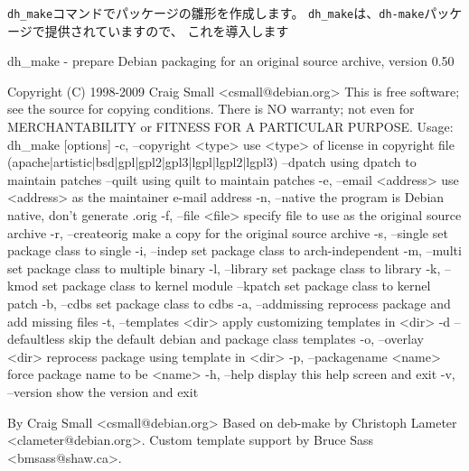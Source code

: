 \documentclass[mingoth,a4paper]{jsarticle}
\begin{document}
{\tt dh\_make}コマンドでパッケージの雛形を作成します。
{\tt dh\_make}は、{\tt dh-make}パッケージで提供されていますので、
これを導入します
\begin{commandline}
dh_make - prepare Debian packaging for an original source archive, version 0.50

Copyright (C) 1998-2009 Craig Small <csmall@debian.org>
This is free software; see the source for copying conditions.  There is NO
warranty; not even for MERCHANTABILITY or FITNESS FOR A PARTICULAR PURPOSE.
  Usage: dh_make [options]
  -c, --copyright <type>    use <type> of license in copyright file
                            (apache|artistic|bsd|gpl|gpl2|gpl3|lgpl|lgpl2|lgpl3)
      --dpatch              using dpatch to maintain patches
      --quilt               using quilt to maintain patches
  -e, --email <address>     use <address> as the maintainer e-mail address
  -n, --native              the program is Debian native, don't generate .orig
  -f, --file <file>         specify file to use as the original source archive
  -r, --createorig          make a copy for the original source archive
  -s, --single              set package class to single
  -i, --indep                           set package class to arch-independent
  -m, --multi               set package class to multiple binary
  -l, --library             set package class to library
  -k, --kmod                set package class to kernel module
      --kpatch              set package class to kernel patch
  -b, --cdbs                set package class to cdbs
  -a, --addmissing          reprocess package and add missing files
  -t, --templates <dir>      apply customizing templates in <dir>
  -d  --defaultless         skip the default debian and package class templates
  -o, --overlay <dir>       reprocess package using template in <dir>
  -p, --packagename <name>  force package name to be <name>
  -h, --help                display this help screen and exit
  -v, --version             show the version and exit

By Craig Small <csmall@debian.org>
Based on deb-make by Christoph Lameter <clameter@debian.org>.
Custom template support by Bruce Sass <bmsass@shaw.ca>.
\end{commandline}
\end{document}
